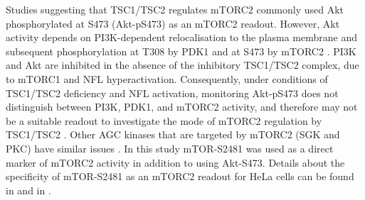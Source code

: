 Studies suggesting that TSC1/TSC2 regulates mTORC2 commonly used Akt phosphorylated at S473 (Akt-pS473) as an mTORC2 readout. However, Akt activity depends on PI3K-dependent relocalisation to the plasma membrane and subsequent phosphorylation at T308 by PDK1 and at S473 by mTORC2 \citep{Pearce2010}. PI3K and Akt are inhibited in the absence of the inhibitory TSC1/TSC2 complex, due to mTORC1 and NFL hyperactivation. Consequently, under conditions of TSC1/TSC2 deficiency and NFL activation, monitoring Akt-pS473 does not distinguish between PI3K, PDK1, and mTORC2 activity, and therefore may not be a suitable readout to investigate the mode of mTORC2 regulation by TSC1/TSC2 \citep{Huang2009complex}. Other AGC kinases that are targeted by mTORC2 (SGK and PKC) have similar issues \citep{Jacinto2008, Bruhn2010}. In this study mTOR-S2481 was used as a direct marker of mTORC2 activity in addition to using Akt-S473. Details about the specificity of mTOR-S2481 as an mTORC2 readout for HeLa cells can be found in \citep{
Copp2009} and in \citep{DallePezze2012a, DallePezze2012b}.

